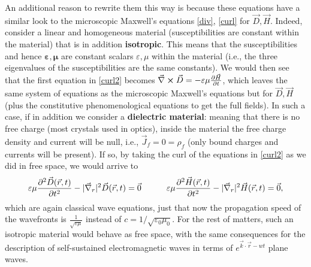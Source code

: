 \documentclass[11pt, a4paper, twoside]{article} %
\begin{document}
An additional reason to rewrite them this way is because these equations have a similar look to the microscopic Maxwell's equations \eqref{div}, \eqref{curl} for $\vec{D},\vec{H}$. Indeed, consider a linear and homogeneous material (susceptibilities are constant within the material) that is in addition {\bf isotropic}. This means that the susceptibilities and hence $\pmb{\varepsilon},\pmb{\mu}$ are constant scalars $\varepsilon,\mu$ within the material (i.e., the three eigenvalues of the susceptibilities are the same constants). We would then see that the first equation in \eqref{curl2} becomes $\vec{\nabla}\cross\vec{D}=-\varepsilon\mu\pdv{\vec{H}}{t}$, which leaves the same system of equations as the microscopic Maxwell's equations but for $\vec{D},\vec{H}$ (plus the constitutive phenomenological equations to get the full fields). In such a case, if in addition we consider a {\bf dielectric material}: meaning that there is no free charge (most crystals used in optics), inside the material the free charge density and current will be null, i.e., $\vec{J}_f=0=\rho_f$ (only bound charges and currents will be present). If so, by taking the curl of the equations in \eqref{curl2} as we did in free space, we would arrive to
\begin{equation}
\varepsilon\mu\pdv[2]{\vec{D}(\vec{r},t)}{t}-|\vec{\nabla}_r|^2\vec{D}(\vec{r},t)=\vec{0} \quad \quad \quad \varepsilon\mu\pdv[2]{\vec{H}(\vec{r},t)}{t}-|\vec{\nabla}_r|^2\vec{H}(\vec{r},t)=\vec{0},
\end{equation}
which are again classical wave equations, just that now the propagation speed of the wavefronts is $\frac{1}{\sqrt{\varepsilon\mu}}$ instead of $c={1}/{\sqrt{\varepsilon_0\mu_0}}$. For the rest of matters, such an isotropic material would behave as free space, with the same consequences for the description of self-sustained electromagnetic waves in terms of $e^{\vec{k}\cdot\vec{r}-wt}$ plane waves.
\end{document}
